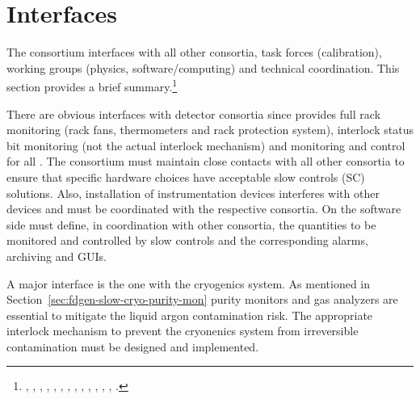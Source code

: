 \section{Interfaces}
\label{sec:fdgen-slow-cryo-intfc}


The  consortium interfaces with all other consortia, task forces (calibration), working groups (physics, software/computing) and technical coordination.
This section provides a brief summary.\footnote{ 
 \cite{bib:docdb6745},
\cite{bib:docdb6991},
\cite{bib:docdb6790},
\cite{bib:docdb6787},
\cite{bib:docdb6784},
\cite{bib:docdb6781},
\cite{bib:docdb6760},
\cite{bib:docdb6679},
\cite{bib:docdb6730},
\cite{bib:docdb7126},
\cite{bib:docdb7099},
\cite{bib:docdb7072},
\cite{bib:docdb7045},
\cite{bib:docdb7018}.}  

There are obvious interfaces with detector consortia since  provides full rack monitoring (rack fans, thermometers and rack protection system),
interlock status bit monitoring (not the actual interlock mechanism) and monitoring and control for all \pwrsupps. The   consortium must maintain close contacts with all other consortia to ensure that specific hardware choices have acceptable slow controls (SC)  solutions.  
Also, installation of instrumentation devices interferes with other devices and must be coordinated with the respective consortia.  
On the software side  must define, in coordination with other consortia, the quantities to be monitored and controlled by slow controls and the corresponding alarms,
archiving and GUIs. 



A major interface is the one with the cryogenics system. As mentioned in Section~\ref{sec:fdgen-slow-cryo-purity-mon} purity monitors and gas analyzers are essential
to mitigate the liquid argon contamination risk. The appropriate interlock mechanism to prevent the cryonenics system from irreversible contamination
must be designed and implemented. 

